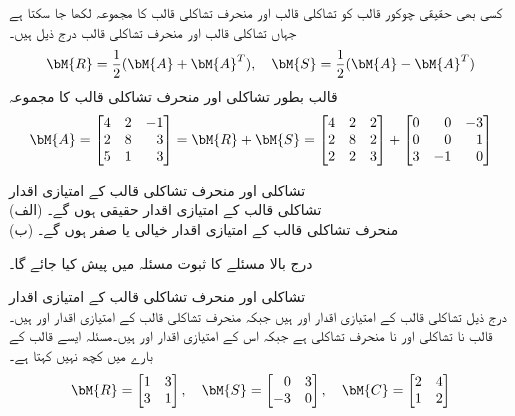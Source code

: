 کسی بھی حقیقی چوکور قالب کو تشاکلی قالب  اور منحرف تشاکلی قالب  کا مجموعہ لکھا جا سکتا ہے جہاں تشاکلی قالب اور منحرف تشاکلی قالب درج ذیل ہیں۔
\begin{align}
\bM{R}=\frac{1}{2}(\bM{A}+\bM{A}^T),\quad \bM{S}=\frac{1}{2}(\bM{A}-\bM{A}^T)
\end{align}
\quad قالب بطور تشاکلی اور منحرف تشاکلی قالب کا مجموعہ\\
\begin{align*}
\bM{A}=\begin{bmatrix*}[r] 4&2&-1\\2&8&3\\5&1&3 \end{bmatrix*}=\bM{R}+\bM{S}=\begin{bmatrix*}[r]4&2&2\\2&8&2\\2&2&3  \end{bmatrix*}+\begin{bmatrix*}[r] 0&0&-3\\0&0&1\\3&-1&0  \end{bmatrix*}
\end{align*}

\quad تشاکلی اور منحرف تشاکلی قالب کے امتیازی اقدار\\
(الف) تشاکلی قالب کے امتیازی اقدار حقیقی ہوں گے۔\\
(ب) منحرف تشاکلی قالب کے امتیازی اقدار خیالی یا صفر ہوں گے۔ 

درج بالا مسئلے کا ثبوت مسئلہ  میں پیش کیا جائے گا۔

\quad تشاکلی اور منحرف تشاکلی قالب کے امتیازی اقدار\\
درج ذیل تشاکلی قالب  کے امتیازی اقدار  اور  ہیں جبکہ منحرف تشاکلی قالب  کے امتیازی اقدار  اور  ہیں۔قالب  نا تشاکلی اور نا منحرف تشاکلی ہے جبکہ اس کے امتیازی اقدار  اور  ہیں۔مسئلہ  ایسے قالب کے بارے میں کچھ نہیں کہتا ہے۔
\begin{align*}
\bM{R}=\begin{bmatrix*}[r]1&3\\3&1  \end{bmatrix*}, \quad\bM{S}=\begin{bmatrix*}[r] 0&3\\-3&0\end{bmatrix*},\quad \bM{C}=\begin{bmatrix}2&4\\1&2  \end{bmatrix}
\end{align*}

